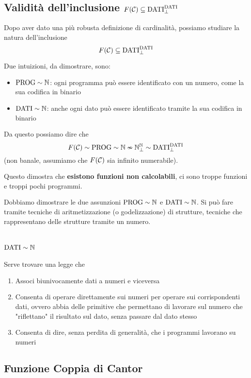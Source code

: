 \subsection{Validità dell'inclusione $F(\mathcal{C}) \subseteq \text{DATI}_\bot^{\text{DATI}}$}

Dopo aver dato una più robusta definizione di cardinalità, possiamo studiare la natura dell'inclusione
$$ F(\mathcal{C}) \subseteq \text{DATI}_\bot^{\text{DATI}} $$

Due intuizioni, da dimostrare, sono: 
\begin{itemize}
	\item $\text{PROG} \sim \mathbb{N}$: ogni programma può essere identificato con un numero, come la sua codifica in binario
	
    \item $\text{DATI} \sim \mathbb{N}$: anche ogni dato può essere identificato tramite la sua codifica in binario
\end{itemize}

Da questo possiamo dire che
$$ F(\mathcal{C}) \sim \text{PROG} \sim \mathbb{N} \nsim \mathbb{N}_\bot^{\mathbb{N}} \sim \text{DATI}_\bot^{\text{DATI}} $$
(non banale, assumiamo che $F(\mathcal{C})$ sia infinito numerabile).

Questo dimostra che \textbf{esistono funzioni non calcolabili}, ci sono troppe funzioni e troppi pochi programmi. 

Dobbiamo dimostrare le due assunzioni $\text{PROG} \sim \mathbb{N}$ e $\text{DATI} \sim \mathbb{N}$. Si può fare tramite tecniche di aritmetizzazione (o godelizzazione) di strutture, tecniche che rappresentano delle strutture tramite un numero.

\section{$\text{DATI} \sim \mathbb{N}$}

Serve trovare una legge che
\begin{enumerate}
	\item Associ biunivocamente dati a numeri e viceversa
	
    \item Consenta di operare direttamente sui numeri per operare sui corrispondenti dati, ovvero abbia delle primitive che permettano di lavorare sul numero che "riflettano" il risultato sul dato, senza passare dal dato stesso
	
    \item Consenta di dire, senza perdita di generalità, che i programmi lavorano su numeri
\end{enumerate}

\subsection{Funzione Coppia di Cantor}

